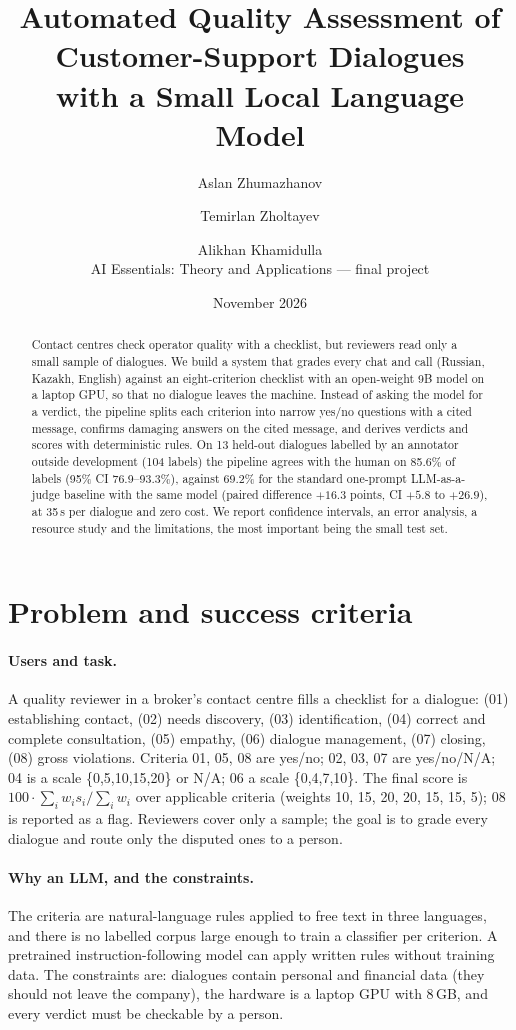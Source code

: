 \documentclass[11pt,a4paper]{article}
\title{Automated Quality Assessment of Customer-Support Dialogues\\with a Small Local Language Model}
\author{Aslan Zhumazhanov \and Temirlan Zholtayev \and Alikhan Khamidulla\\[2pt]
\small AI Essentials: Theory and Applications --- final project}
\date{November 2026}
\begin{document}
\maketitle

\begin{abstract}
Contact centres check operator quality with a checklist, but reviewers read only a small sample of
dialogues. We build a system that grades every chat and call (Russian, Kazakh, English) against an
eight-criterion checklist with an open-weight 9B model on a laptop GPU, so that no dialogue leaves the
machine. Instead of asking the model for a verdict, the pipeline splits each criterion into narrow yes/no
questions with a cited message, confirms damaging answers on the cited message, and derives verdicts and
scores with deterministic rules. On 13 held-out dialogues labelled by an annotator outside development
(104 labels) the pipeline agrees with the human on 85.6\% of labels (95\% CI 76.9--93.3\%), against
69.2\% for the standard one-prompt LLM-as-a-judge baseline with the same model (paired difference
$+16.3$ points, CI $+5.8$ to $+26.9$), at 35\,s per dialogue and zero cost. We report confidence intervals, an error analysis, a resource study and the limitations, the most
important being the small test set.
\end{abstract}

\section{Problem and success criteria}
\paragraph{Users and task.} A quality reviewer in a broker's contact centre fills a checklist for a dialogue:
(01) establishing contact, (02) needs discovery, (03) identification, (04) correct and complete consultation,
(05) empathy, (06) dialogue management, (07) closing, (08) gross violations. Criteria 01, 05, 08 are yes/no;
02, 03, 07 are yes/no/N/A; 04 is a scale \{0,5,10,15,20\} or N/A; 06 a scale \{0,4,7,10\}. The final score is
$100\cdot\sum_i w_i s_i/\sum_i w_i$ over applicable criteria (weights 10, 15, 20, 20, 15, 15, 5); 08 is
reported as a flag. Reviewers cover only a sample; the goal is to grade every dialogue and route only the
disputed ones to a person.

\paragraph{Why an LLM, and the constraints.} The criteria are natural-language rules applied to free text in
three languages, and there is no labelled corpus large enough to train a classifier per criterion. A
pretrained instruction-following model can apply written rules without training data. The constraints are:
dialogues contain personal and financial data (they should not leave the company), the hardware is a
laptop GPU with 8\,GB, and every verdict must be checkable by a person.
\end{document}
